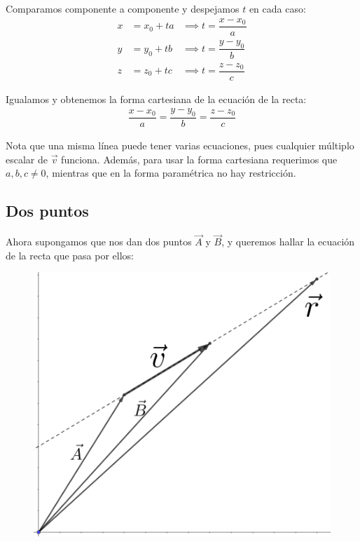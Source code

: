 \documentclass[12pt, fleqn]{report}                             %
\theoremstyle{break}                                            %
\begin{document}
            Comparamos componente a componente y despejamos $t$ en cada caso:
            \begin{align*}
                x &= x_0 + ta &\implies t = \dfrac{x - x_0}{a} \\
                y &= y_0 + tb &\implies t = \dfrac{y - y_0}{b} \\
                z &= z_0 + tc &\implies t = \dfrac{z - z_0}{c}
            \end{align*}
            
            Igualamos y obtenemos la forma cartesiana de la ecuación de la recta:
            \begin{align}
                \dfrac{x - x_0}{a} = \dfrac{y - y_0}{b} = \dfrac{z - z_0}{c} \label{lineEquation1}
            \end{align}
            
            Nota que una misma línea puede tener varias ecuaciones, pues cualquier múltiplo escalar de $\vec{v}$ funciona. Además, para usar la forma cartesiana requerimos que $a,b,c\neq 0$, mientras que en la forma paramétrica no hay restricción.
            
            
            \subsection{Dos puntos}
            
            Ahora supongamos que nos dan dos puntos $\vec{A}$ y $\vec{B}$, y queremos hallar la ecuación de la recta que pasa por ellos:
            
            \begin{figure}[H]
                \centering
                \includegraphics[scale=1.2]{line2.png}
            \end{figure}
        
\end{document}

